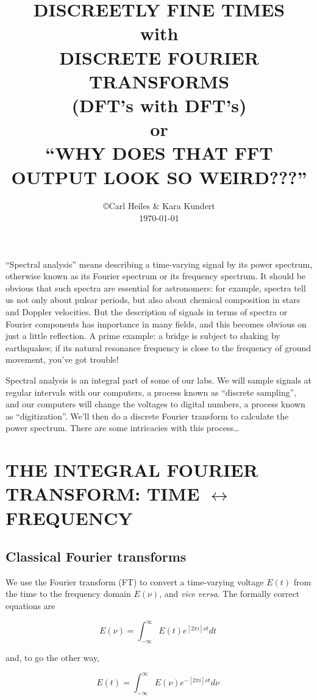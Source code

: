 \documentclass[preprint]{aastex}
\begin{document}
\setcounter{section}{-1}

\title{DISCREETLY FINE TIMES \\ with \\ DISCRETE FOURIER TRANSFORMS \\
(DFT's with DFT's) \\ or \\ ``WHY DOES THAT FFT OUTPUT LOOK SO
WEIRD???''}

\author{\copyright Carl Heiles \& Kara Kundert \\ \today }

          ``Spectral analysis'' means describing a time-varying signal
by its power spectrum, otherwise known as its Fourier spectrum or its
frequency spectrum.  It should be obvious that such spectra are essential for
astronomers: for example, spectra tell us not only about pulsar periods,
but also about chemical composition in stars and Doppler velocities. 
But the description of signals in terms of spectra or Fourier components
has importance in many fields, and this becomes obvious on just a little
reflection.  A prime example: a bridge is subject to shaking by
earthquakes; if its natural resonance frequency is close to the
frequency of ground movement, you've got trouble!

	Spectral analysis is an integral part of some of our labs.  We
will sample signals at regular intervals with our computers, a process
known as ``discrete sampling'', and our computers will change the
voltages to digital numbers, a process known as ``digitization''. We'll
then do a discrete Fourier transform to calculate the power spectrum.
There are some intricacies with this process\dots

\tableofcontents

\section{THE INTEGRAL FOURIER TRANSFORM: TIME $\leftrightarrow$ FREQUENCY}

\subsection{Classical Fourier transforms}

          We use the Fourier transform (FT) to convert a time-varying
voltage $E(t)$ from the time to the frequency domain $E(\nu)$, and {\it
vice versa}.  The formally correct equations are

\begin{mathletters} \begin{equation}
\label{eqone}
E(\nu) = \int_{-\infty}^{\infty} E(t) e^{[2 \pi i]\nu t}  dt \; 
\end{equation}

\noindent and, to go the other way, 

\begin{equation}
E(t) = \int_{-\infty}^{\infty} E(\nu) e^{-[2 \pi i]\nu t}  d\nu \; 
\end{equation}
\end{mathletters}
\end{document}
